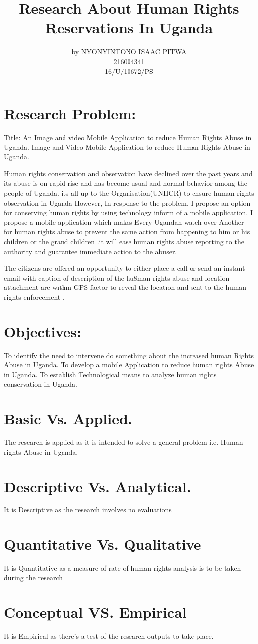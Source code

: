 \documentclass[10pt,letterpaper]{article}
\begin{document}
\title{Research About Human Rights Reservations In Uganda}
\author{by NYONYINTONO ISAAC PITWA \\ 216004341\\  16/U/10672/PS}
\maketitle
\section{Research Problem: }
Title: An Image and video Mobile Application to reduce Human Rights Abuse in Uganda.
Image and Video Mobile Application to reduce Human Rights Abuse in Uganda.

Human rights conservation and observation have declined over the past years and  its abuse is on rapid rise and has become usual and normal behavior among the people of Uganda. its all up to the Organisation(UNHCR) to ensure human rights observation in Uganda 
However,
In response to the problem. I propose  an option for conserving human rights by using technology inform of a mobile application. 
I propose a mobile application which makes Every Ugandan watch over Another  for human rights abuse to prevent the same action from happening to him or his children or the grand children .it will ease human rights abuse reporting to the authority and guarantee immediate action to the abuser.

The citizens are offered an opportunity to either place a call or send an instant email with caption of description of the hu8man rights abuse and location attachment are within  GPS factor to reveal the location and sent to the human rights  enforcement .


\section{Objectives: }
To identify the need to intervene do something about the increased human Rights Abuse in Uganda.
To develop a mobile Application  to reduce human rights Abuse in Uganda.
To establish Technological means to analyze human rights conservation in Uganda.


\section{Basic Vs. Applied.}
The research is applied as it is intended to solve a general problem i.e. Human rights Abuse in Uganda.
\section{Descriptive Vs. Analytical.}
It is Descriptive as the research involves no evaluations  
\section{Quantitative Vs. Qualitative}
  It is Quantitative as a measure of rate of human rights analysis is to be taken during the research
\section{Conceptual VS. Empirical}
It  is Empirical as there’s a test of the research outputs to take place.
\end{document}
